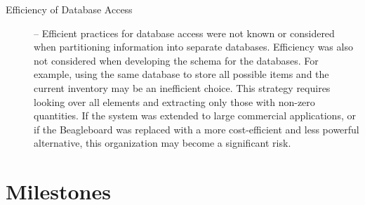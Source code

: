 \documentclass[11pt]{article} %
\begin{document}
\begin{description}
\item[Efficiency of Database Access] -- Efficient practices for database access were not known or considered when partitioning information into separate databases. Efficiency was also not considered when developing the schema for the databases. For example, using the same database to store all possible items and the current inventory may be an inefficient choice. This strategy requires looking over all elements and extracting only those with non-zero quantities. If the system was extended to large commercial applications, or if the Beagleboard was replaced with a more cost-efficient and less powerful alternative, this organization may become a significant risk.
\end{description}
\pagebreak
\section{Milestones}
\end{document}
